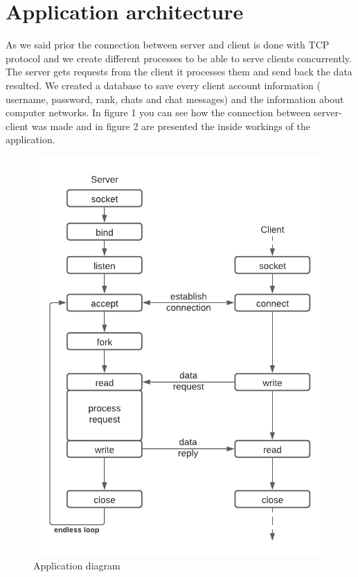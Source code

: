\documentclass[runningheads]{llncs}
\begin{document}
\section{Application architecture}
\par As we said prior the connection between server and client is done with TCP protocol and we create different processes to be able to serve clients concurrently. The server gets requests from the client it processes them and send back the data resulted. We created a database to save every client account information ( username, password, rank, chats and chat messages) and the information about computer networks. In figure 1 you can see how the connection between server-client was made and in figure 2 are presented the inside workings of the application. 

\begin{figure}[H]
\includegraphics[]{images/client-server.png}
\caption{Application diagram}
\end{figure}
\end{document}
